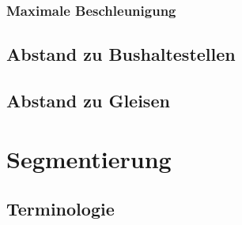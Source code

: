 \subsubsection{Maximale Beschleunigung}
\subsection{Abstand zu Bushaltestellen}
\subsection{Abstand zu Gleisen}
\clearpage

\section{Segmentierung}
\subsection{Terminologie}
